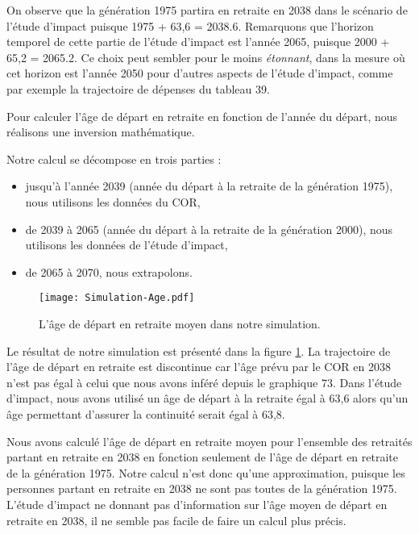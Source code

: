 \documentclass[10pt]{article}
\begin{document}
On observe que la génération 1975 partira en retraite en 2038 dans le scénario de l'étude d'impact puisque 1975 + 63,6 = 2038.6.
Remarquons que l'horizon temporel de cette partie de l'étude d'impact est l'année 2065, puisque 2000 + 65,2 = 2065.2. 
Ce choix peut sembler pour le moins \emph{étonnant}, dans la mesure où cet horizon 
est l'année 2050 pour d'autres aspects de l'étude d'impact, 
comme par exemple la trajectoire de dépenses du tableau 39. 

Pour calculer l'âge de départ en retraite en fonction de l'année du départ, 
nous réalisons une inversion mathématique.  

Notre calcul se décompose en trois parties :
\begin{itemize}
\item jusqu'à l'année 2039 (année du départ à la retraite 
de la génération 1975), nous utilisons les données du COR, 
\item de 2039 à 2065 (année du départ à la retraite de la génération 
2000), nous utilisons les données de l'étude d'impact,
\item de 2065 à 2070, nous extrapolons. 
\end{itemize}


\begin{figure}
\begin{center}
\texttt{[image: Simulation-Age.pdf]}
\end{center}
\caption{L'âge de départ en retraite moyen dans notre simulation.}
\label{fig-simulation-A}
\end{figure}

Le résultat de notre simulation est présenté dans la figure \ref{fig-simulation-A}. 
La trajectoire de l'âge de départ en retraite est discontinue car l'âge prévu par le COR en 2038 n'est pas égal à celui que nous avons inféré depuis le graphique 73. Dans l'étude d'impact, nous avons utilisé un âge de départ à la retraite égal à 63,6 alors qu'un âge permettant d'assurer la continuité serait égal à 63,8.

Nous avons calculé l'âge de départ en retraite moyen pour l'ensemble des retraités partant en retraite en 2038 en fonction seulement de l'âge de départ en retraite de la génération 1975. Notre calcul n'est donc qu'une approximation, puisque les personnes partant en retraite en 2038 ne sont pas toutes de la génération 1975. L'étude d'impact ne donnant pas d'information sur l'âge moyen de départ en retraite en 2038, il ne semble pas facile de faire un calcul plus précis. 
\end{document}
